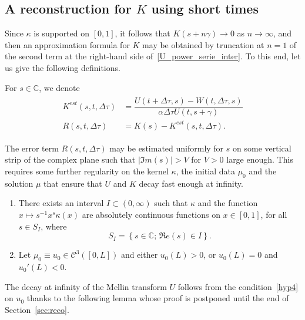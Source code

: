 \documentclass[AHL,Unicode,longabstracts,published]{cedram}
\renewcommand*\a{\alpha}
\newcommand*\C{\mathbb{C}}
\newcommand{\clC}{\mathcal{C}}
\newcommand*{\Hypenumi}{\renewcommand*{\theenumi}{\textbf{Hyp-\arabic{enumi}}}}
\begin{document}
\subsection{A reconstruction for \texorpdfstring{$K$}{K} using short times}

Since $\kappa$ is supported on $[0,1]$, it follows that $K(s+n\gamma) \to 0$ as $n\to \infty$, {and then} an approximation formula for $K$ may be obtained by truncation at $n=1$ of the second term at the right-hand side of~\eqref{U_power_serie_inter}. To this end, let us give the following definitions.

\begin{defi}\label{def:Kest}
For $s\in \C$, we denote
\begin{align}\label{reco2}
\begin{split}
 K^{est}(s,t,\Delta \tau) &=\dfrac{U(t+\Delta \tau, s) - W(t,\Delta \tau, s) }{\a \Delta \tau U(t,s+\gamma)} \\
R(s,t,\Delta \tau)&= K(s) - K^{est}(s,t,\Delta \tau). 
\end{split}
\end{align}
\end{defi}

The error term $R(s,t,\Delta \tau)$ may be estimated uniformly for $s$ on some vertical strip of the complex plane such that $|\Im m (s)|>V$ for $V>0$ large enough. This requires some further regularity on the kernel $\kappa $, the initial data $\mu_0$ and the solution $\mu $ that ensure that $U$ and $K$ decay fast enough at infinity.


\begin{enumerate}\Hypenumi
\setcounter{enumi}{2}
\item \label{hyp3}
There exists an interval $I\subset (0, \infty)$ such that $\kappa $ and the function $x\mapsto s^{-1}x^{s}\kappa (x)$ are absolutely continuous functions on $x\in [0, 1]$, for all $s\in S_I$, where
\begin{equation*}
S_I=\left\{s\in \C;\,\Re e(s)\in I \right\}.
\end{equation*}
\item \label{hyp4}
Let $\mu _0\equiv u_0\in \clC^3([0,L])$ and either $u_0(L)>0$, or $u_0(L)=0$ and $u_0'(L)<0$.
\end{enumerate}
The decay at infinity of the Mellin transform $U$ follows from the condition~\eqref{hyp4} on $u_0$ thanks to the following lemma whose proof is postponed until the end of Section~\ref{sec:reco}.
\end{document}
